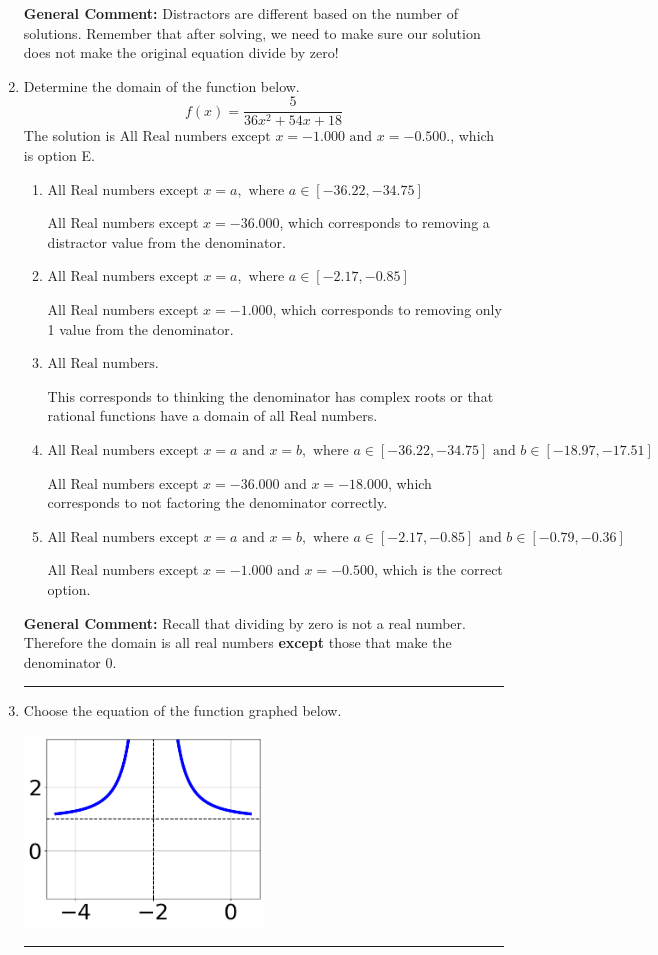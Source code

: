 \documentclass{extbook}[14pt]
\newcommand{\litem}[1]{\item #1

\rule{\textwidth}{0.4pt}}
\begin{document}
\begin{enumerate}
{\textbf{General Comment:} Distractors are different based on the number of solutions. Remember that after solving, we need to make sure our solution does not make the original equation divide by zero!
}
\litem{
Determine the domain of the function below.
\[ f(x) = \frac{5}{36x^{2} +54 x + 18} \]The solution is \( \text{All Real numbers except } x = -1.000 \text{ and } x = -0.500. \), which is option E.\begin{enumerate}[label=\Alph*.]
\item \( \text{All Real numbers except } x = a, \text{ where } a \in [-36.22, -34.75] \)

All Real numbers except $x = -36.000$, which corresponds to removing a distractor value from the denominator.
\item \( \text{All Real numbers except } x = a, \text{ where } a \in [-2.17, -0.85] \)

All Real numbers except $x = -1.000$, which corresponds to removing only 1 value from the denominator.
\item \( \text{All Real numbers.} \)

This corresponds to thinking the denominator has complex roots or that rational functions have a domain of all Real numbers.
\item \( \text{All Real numbers except } x = a \text{ and } x = b, \text{ where } a \in [-36.22, -34.75] \text{ and } b \in [-18.97, -17.51] \)

All Real numbers except $x = -36.000$ and $x = -18.000$, which corresponds to not factoring the denominator correctly.
\item \( \text{All Real numbers except } x = a \text{ and } x = b, \text{ where } a \in [-2.17, -0.85] \text{ and } b \in [-0.79, -0.36] \)

All Real numbers except $x = -1.000$ and $x = -0.500$, which is the correct option.
\end{enumerate}

\textbf{General Comment:} Recall that dividing by zero is not a real number. Therefore the domain is all real numbers \textbf{except} those that make the denominator 0.
}
\litem{
Choose the equation of the function graphed below.

\begin{center}
    \includegraphics[width=0.5\textwidth]{../Figures/rationalGraphToEquationA.png}
\end{center}


}
\end{enumerate}
\end{document}
